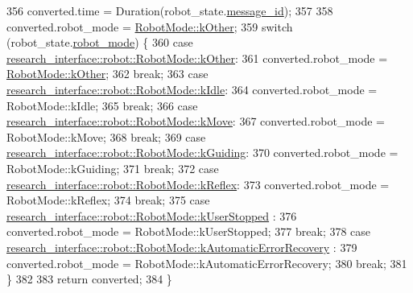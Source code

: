 \begin{DoxyCode}
356   converted.time = Duration(robot\_state.\hyperlink{structresearch__interface_1_1robot_1_1RobotState_a803676123685390b8c4d5a3907d16e7c}{message\_id});
357 
358   converted.robot\_mode = \hyperlink{namespacetesting_1_1internal_aa8747bda20137c9aa7f846dee830e686ad47f29150ab7a9ec8ce2491f44537347}{RobotMode::kOther};
359   \textcolor{keywordflow}{switch} (robot\_state.\hyperlink{structresearch__interface_1_1robot_1_1RobotState_a39452d1cd54a0a8b70d5eb6389bbeee7}{robot\_mode}) \{
360     \textcolor{keywordflow}{case} \hyperlink{namespaceresearch__interface_1_1robot_a54ee0c8bfefd2ee8a46837ca6d2b1213a341b8a8f03cf33821c46aa5c3aad4b7a}{research\_interface::robot::RobotMode::kOther}:
361       converted.robot\_mode = \hyperlink{namespacetesting_1_1internal_aa8747bda20137c9aa7f846dee830e686ad47f29150ab7a9ec8ce2491f44537347}{RobotMode::kOther};
362       \textcolor{keywordflow}{break};
363     \textcolor{keywordflow}{case} \hyperlink{namespaceresearch__interface_1_1robot_abd2451eb963a1843f1eb066ebd4b06e8af5137a026a4b2f3b1c8a21cfc60dd14b}{research\_interface::robot::RobotMode::kIdle}:
364       converted.robot\_mode = RobotMode::kIdle;
365       \textcolor{keywordflow}{break};
366     \textcolor{keywordflow}{case} \hyperlink{namespaceresearch__interface_1_1robot_a9d089d8f41640bff616c6d4c69ae5c37ae54c7412401b5e36c1c254e6fb17a3dd}{research\_interface::robot::RobotMode::kMove}:
367       converted.robot\_mode = RobotMode::kMove;
368       \textcolor{keywordflow}{break};
369     \textcolor{keywordflow}{case} \hyperlink{namespaceresearch__interface_1_1robot_a9d089d8f41640bff616c6d4c69ae5c37a3f62c59dc456d870c5232af7b73944ea}{research\_interface::robot::RobotMode::kGuiding}:
370       converted.robot\_mode = RobotMode::kGuiding;
371       \textcolor{keywordflow}{break};
372     \textcolor{keywordflow}{case} \hyperlink{namespaceresearch__interface_1_1robot_a9d089d8f41640bff616c6d4c69ae5c37a24a5ddd7430a2592185005fce3881f62}{research\_interface::robot::RobotMode::kReflex}:
373       converted.robot\_mode = RobotMode::kReflex;
374       \textcolor{keywordflow}{break};
375     \textcolor{keywordflow}{case} \hyperlink{namespaceresearch__interface_1_1robot_a9d089d8f41640bff616c6d4c69ae5c37aaef321f1c9c879b98c2bcd307ad2305f}{research\_interface::robot::RobotMode::kUserStopped}
      :
376       converted.robot\_mode = RobotMode::kUserStopped;
377       \textcolor{keywordflow}{break};
378     \textcolor{keywordflow}{case} \hyperlink{namespaceresearch__interface_1_1robot_a9d089d8f41640bff616c6d4c69ae5c37ab37e3f1dba8351f3745083064998b35f}{research\_interface::robot::RobotMode::kAutomaticErrorRecovery}
      :
379       converted.robot\_mode = RobotMode::kAutomaticErrorRecovery;
380       \textcolor{keywordflow}{break};
381   \}
382 
383   \textcolor{keywordflow}{return} converted;
384 \}
\end{DoxyCode}
